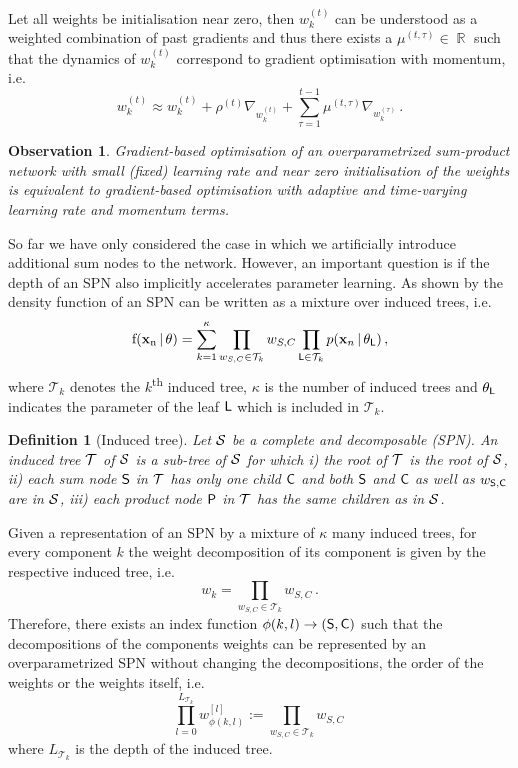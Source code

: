 \documentclass{article}
\DeclareMathOperator*{\R}{\mathbb{R}}
\DeclareMathOperator*{\f}{f(\xn \,|\, \theta)}
\newcommand{\wt}{w^{(t)}_{k}}
\newtheorem{observation}{Observation}
\newtheorem{definition}{Definition}
\begin{document}
Let all weights be initialisation near zero, then $\wt$ can be understood as a weighted combination of past gradients and thus there exists a $\mu^{(t,\tau)} \in \R$ such that the dynamics of $\wt$ correspond to gradient optimisation with momentum, i.e. 
\begin{equation}
  \wt \approx \wt + \rho^{(t)} \nabla_{\wt} + \sum_{\tau=1}^{t-1} \mu^{(t,\tau)} \nabla_{w^{(\tau)}_k} \, .
\end{equation}

\begin{observation}
Gradient-based optimisation of an overparametrized sum-product network with small (fixed) learning rate and near zero initialisation of the weights is equivalent to gradient-based optimisation with adaptive and time-varying learning rate and momentum terms.
\end{observation}

So far we have only considered the case in which we artificially introduce additional sum nodes to the network.
However, an important question is if the depth of an SPN also implicitly accelerates parameter learning.
As shown by \cite{Zhao2016} the density function of an SPN can be written as a mixture over induced trees, i.e. 
\[
\f = \sum_{k=1}^{\kappa} \prod_{w_{S,C} \in \mathcal{T}_k} w_{S,C} \prod_{\Leaf \in \mathcal{T}_k} p(\xn \,|\, \theta_{\Leaf}) \, ,
\]
where $\mathcal{T}_k$ denotes the $k$\textsuperscript{th} induced tree, $\kappa$ is the number of induced trees and $\theta_{\mathsf{L}}$ indicates the parameter of the leaf $\mathsf{L}$ which is included in $\mathcal{T}_k$.

\begin{definition}[Induced tree]
Let $\mathcal{S}$ be a complete and decomposable (SPN).
An induced tree $\mathcal{T}$ of $\mathcal{S}$ is a sub-tree of $\mathcal{S}$ for which i) the root of $\mathcal{T}$ is the root of $\mathcal{S}$, ii) each sum node $\mathsf{S}$ in $\mathcal{T}$ has only one child $\mathsf{C}$ and both $\mathsf{S}$ and $\mathsf{C}$ as well as $w_{\mathsf{S},\mathsf{C}}$ are in $\mathcal{S}$, iii) each product node $\mathsf{P}$ in $\mathcal{T}$ has the same children as in $\mathcal{S}$.
\end{definition}

Given a representation of an SPN by a mixture of $\kappa$ many induced trees, for every component $k$ the weight decomposition of its component is given by the respective induced tree, i.e.
\[
  w_k = \prod_{w_{S,C} \in \mathcal{T}_k} w_{S,C} \, .
\]
Therefore, there exists an index function $\phi(k, l) \rightarrow (\mathsf{S},\mathsf{C})$ such that the decompositions of the components weights can be represented by an overparametrized SPN without changing the decompositions, the order of the weights or the weights itself, i.e.
\[
\prod_{l=0}^{L_{\mathcal{T}_k}} w^{[l]}_{\phi(k, l)} := \prod_{w_{S,C} \in \mathcal{T}_k} w_{S,C} \, 
\]
where $L_{\mathcal{T}_k}$ is the depth of the induced tree.
\end{document}
